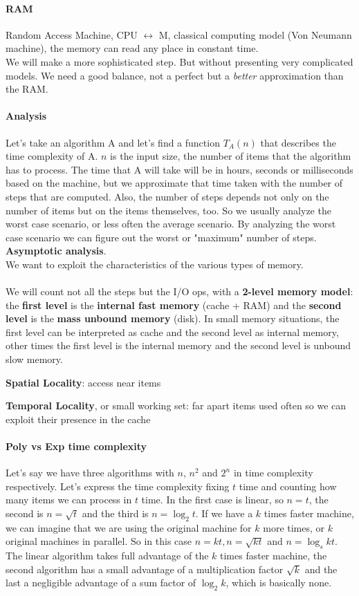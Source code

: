 \documentclass[10pt]{report}
\begin{document}
\paragraph{RAM} Random Access Machine, CPU $\leftrightarrow$ M, classical computing model (Von Neumann machine), the memory can read any place in constant time.\\
We will make a more sophisticated step. But without presenting very complicated models. We need a good balance, not a perfect but a \textit{better} approximation than the RAM.
\paragraph{Analysis} Let's take an algorithm A and let's find a function $T_A(n)$ that describes the time complexity of A. $n$ is the input size, the number of items that the algorithm has to process. The time that A will take will be in hours, seconds or milliseconds based on the machine, but we approximate that time taken with the number of steps that are computed. Also, the number of steps depends not only on the number of items but on the items themselves, too. So we usually analyze the worst case scenario, or less often the average scenario. By analyzing the worst case scenario we can figure out the worst or "maximum" number of steps. \textbf{Asymptotic analysis}.\\
We want to exploit the characteristics of the various types of memory.\\\\
We will count not all the steps but the I/O ops, with a \textbf{2-level memory model}: the \textbf{first level} is the \textbf{internal fast memory} (cache + RAM) and the \textbf{second level} is the \textbf{mass unbound memory} (disk). In small memory situations, the first level can be interpreted as cache and the second level as internal memory, other times the first level is the internal memory and the second level is unbound slow memory.
\begin{list}{}{}
	\item \textbf{Spatial Locality}: access near items
	\item \textbf{Temporal Locality}, or small working set: far apart items used often so we can exploit their presence in the cache
\end{list}
\paragraph{Poly vs Exp time complexity} Let's say we have three algorithms with $n$, $n^2$ and $2^n$ in time complexity respectively. Let's express the time complexity fixing $t$ time and counting how many items we can process in $t$ time. In the first case is linear, so $n = t$, the second is $n = \sqrt{t}$ and the third is $n = \log_2 t$. If we have a $k$ times faster machine, we can imagine that we are using the original machine for $k$ more times, or $k$ original machines in parallel. So in this case $n = kt, n = \sqrt{kt}$ and $n = \log_s kt$. The linear algorithm takes full advantage of the $k$ times faster machine, the second algorithm has a small advantage of a multiplication factor $\sqrt{k}$ and the last a negligible advantage of a sum factor of $\log_2 k$, which is basically none.
\end{document}
